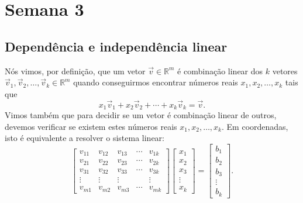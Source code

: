 


\providecommand{\dir}{..}


%

\chapter{Semana 3}

\section{Dependência e independência linear}

Nós vimos, por definição, que um vetor $\vec{v} \in \mathbb{R}^m$ é combinação linear dos $k$ vetores $\vec{v}_1, \vec{v}_2, \dots, \vec{v}_k  \in \mathbb{R}^m$ quando conseguirmos encontrar números reais $x_1, x_2, \dots, x_k$ tais que
\begin{equation}
x_1 \vec{v}_1 + x_2 \vec{v}_2 + \cdots + x_k \vec{v}_k = \vec{v}.
\end{equation} Vimos também que para decidir se um vetor é combinação linear de outros, devemos verificar se existem estes números reais $x_1, x_2, \dots, x_k$. Em coordenadas, isto é equivalente a resolver o sistema linear:
\begin{equation}
\left[
  \begin{array}{ccccc}
   v_{11} & v_{12} & v_{13} & \cdots & v_{1k}  \\
   v_{21} & v_{22} & v_{23} & \cdots & v_{2k}  \\
   v_{31} & v_{32} & v_{33} & \cdots & v_{3k}  \\
   \vdots & \vdots & \vdots &        & \vdots  \\
   v_{m1} & v_{m2} & v_{m3} & \cdots & v_{mk}
  \end{array}
\right] \left[
  \begin{array}{c}
    x_{1} \\
    x_{2} \\
    x_{3} \\
    \vdots \\
    x_{k}
  \end{array}
\right] =
\left[
  \begin{array}{c}
    b_{1} \\
    b_{2} \\
    b_{3} \\
    \vdots \\
    b_{k}
  \end{array}
\right].
\end{equation}

